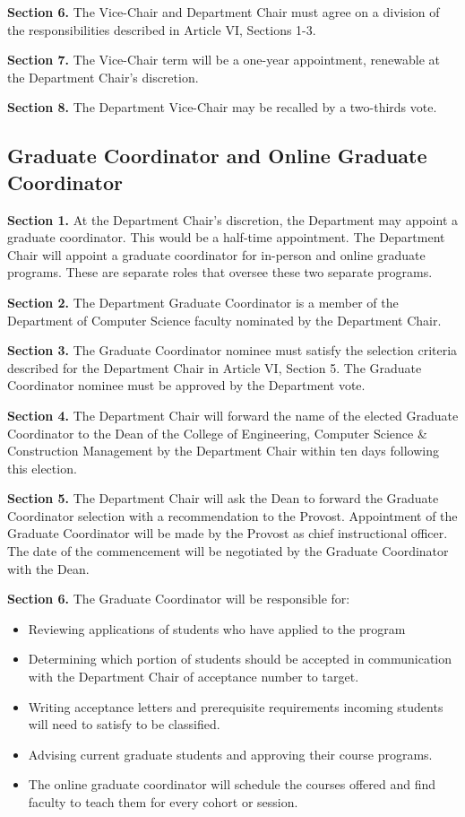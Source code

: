\documentclass{scrartcl}
\begin{document}
\textbf{Section 6.} The Vice-Chair and Department Chair must agree on a division of the responsibilities described in Article VI, Sections 1-3.

\textbf{Section 7.} The Vice-Chair term will be a one-year appointment, renewable at the Department Chair’s discretion.

\textbf{Section 8.} The Department Vice-Chair may be recalled by a two-thirds vote.

\subsection*{Graduate Coordinator and Online Graduate Coordinator}
{}


\textbf{Section 1.} At the Department Chair's discretion, the Department may appoint a graduate coordinator. This would be a half-time appointment. The Department Chair will appoint a graduate coordinator for in-person and online graduate programs. These are separate roles that oversee these two separate programs.

\textbf{Section 2.} The Department Graduate Coordinator is a member of the Department of Computer Science faculty nominated by the Department Chair.

\textbf{Section 3.} The Graduate Coordinator nominee must satisfy the selection criteria described for the Department Chair in Article VI, Section 5. The Graduate Coordinator nominee must be approved by the Department vote.

\textbf{Section 4.} The Department Chair will forward the name of the elected Graduate Coordinator to the Dean of the College of Engineering, Computer Science \& Construction Management by the Department Chair within ten days following this election.

\textbf{Section 5.} The Department Chair will ask the Dean to forward the Graduate Coordinator selection with a recommendation to the Provost. Appointment of the Graduate Coordinator will be made by the Provost as chief instructional officer. The date of the commencement will be negotiated by the Graduate Coordinator with the Dean.

\textbf{Section 6.} The Graduate Coordinator will be responsible for:

\begin{itemize}
\item Reviewing applications of students who have applied to the program
\item Determining which portion of students should be accepted in communication with the Department Chair of acceptance number to target.
\item Writing acceptance letters and prerequisite requirements incoming students will need to satisfy to be classified.
\item Advising current graduate students and approving their course programs.
\item The online graduate coordinator will schedule the courses offered and find faculty to teach them for every cohort or session.
\end{itemize}
\end{document}
